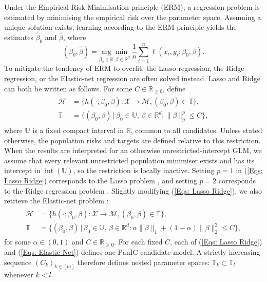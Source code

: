 \documentclass[12pt]{article}
\newcommand{\blue}[1]{\textcolor[rgb]{0.00,0.00,1.00}{#1}}
\theoremstyle{remark}
\theoremstyle{plain}
\begin{document}
Under the Empirical Risk Minimisation principle (ERM), a regression problem is estimated by minimising the empirical risk over the parameter space. Assuming a unique solution exists, learning according to the ERM principle yields the estimates $\hat{\beta}_0$ and $\hat{\beta}$, where
\[
\left(\hat{\beta}_{0},\hat{\beta}\right)=\underset{\beta_{0}\in\mathbb{R},\beta\in\mathbb{R}^{d}}{\arg\min}~\frac{1}{n}\sum_{i=1}^{n}\ell\left(x_{i},y_{i};\beta_{0},\beta\right).
\]
To mitigate the tendency of ERM to overfit, the Lasso regression, the Ridge regression, or the Elastic-net regression are often solved instead. Lasso and Ridge can both be written as follows. For some $C\in\mathbb{R}_{\geq0}$, define
\begin{align}\label{Eqs: Lasso Ridge}
\begin{split}
    \mathcal{H} &= \{h(\cdot; \beta_0, \beta): \mathcal{X} \to \mathcal{M}, (\beta_0, \beta) \in \mathbb{T}\},\\
    \mathbb{T} &= \{(\beta_0, \beta) \, |\, \beta_0 \in \mathbb{U},\, \beta\in \mathbb{R}^d: \lVert\beta\rVert_p^p \leq C\},
\end{split}
\end{align}
where $\mathbb{U}$ is a fixed compact \blue{interval} in $\mathbb{R}$, common to all candidates. \blue{Unless stated otherwise, the population risks and targets are defined relative to this restriction. When the results are interpreted for an otherwise unrestricted-intercept GLM, we assume that every relevant unrestricted population minimiser exists and has its intercept in $\operatorname{int}(\mathbb U)$, so the restriction is locally inactive.} Setting $p=1$ in (\ref{Eqs: Lasso Ridge}) corresponds to the Lasso problem \citep{tibshirani_regression_1996}, and setting $p=2$ corresponds to the Ridge regression problem \citep{hoerl_ridge_1970}.
Slightly modifying (\ref{Eqs: Lasso Ridge}), we also retrieve the Elastic-net problem
\citep{zou_regularization_2005}:
\begin{align}\label{Eqs: Elastic Net}
\begin{split}
    \mathcal{H} &= \{h(\cdot; \beta_0, \beta): \mathcal{X} \to \mathcal{M}, (\beta_0, \beta) \in \mathbb{T}\},\\
    \mathbb{T} &= \{(\beta_0, \beta) \, |\, \beta_0 \in \mathbb{U},\, \beta\in \mathbb{R}^d: \alpha\lVert\beta\rVert_1 + (1-\alpha)\lVert\beta\rVert_2^2 \leq C\},
\end{split}
\end{align}
for some $\alpha \in (0, 1)$ and $C\in\mathbb{R}_{\geq0}$. For each fixed $C$, each of (\ref{Eqs: Lasso Ridge}) and (\ref{Eqs: Elastic Net}) defines one PanIC candidate model. A strictly increasing sequence $(C_k)_{k\in\left[m\right]}$ therefore defines nested parameter spaces: $\mathbb{T}_k\subset\mathbb{T}_l$ whenever $k<l$.
\end{document}
